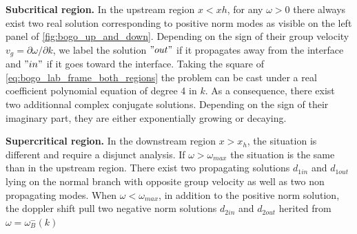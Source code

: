 \bigskip

\textbf{Subcritical region.} In the upstream region $x<xh$, for any $\omega>0$ there always exist two real solution corresponding to positive norm modes as visible on the left panel of \autoref{fig:bogo_up_and_down}. Depending
on the sign of their group velocity $v_g=\partial\omega/\partial k$, we label the solution $"out"$ if it propagates away from the interface and $"in"$ if it goes toward the interface. 
Taking the square of \autoref{eq:bogo_lab_frame_both_regions} the problem can be cast under a real coefficient polynomial equation of degree 4 in $k$. As a consequence,
there exist two additionnal complex conjugate solutions. Depending on the sign of their imaginary part, they are either exponentially growing or decaying. 

\bigskip


\textbf{Supercritical region.} In the downstream region $x>x_h$, the situation is different and require a disjunct analysis. If $\omega>\omega_{max}$ the situation is the same than in the upstream 
region. There exist two propagating solutions $d_{1in}$ and $d_{1out}$ lying on the normal branch with opposite group velocity as well as two non propagating modes. When $\omega<\omega_{max}$, in addition to the positive norm solution, the doppler shift pull two negative norm solutions $d_{2in}$ and $d_{2out}$ herited from $\omega=\omega^-_B(k)$


